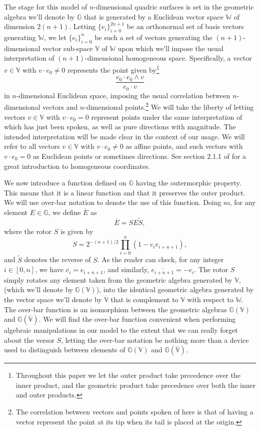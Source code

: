 \documentclass{birkjour}
\theoremstyle{definition}
\theoremstyle{remark}
\numberwithin{equation}{section}
\newcommand{\G}{\mathbb{G}}
\newcommand{\V}{\mathbb{V}}
\newcommand{\W}{\mathbb{W}}
\begin{document}
The stage for this model of $n$-dimensional quadric surfaces is set in the geometric
algebra we'll denote by $\G$ that is generated by a Euclidean vector space $\W$ of dimension
$2(n+1)$.  Letting $\{e_i\}_{i=0}^{2n+1}$ be an orthonormal set of basis vectors
generating $\W$, we let $\{e_i\}_{i=0}^n$ be such a set of vectors generating
the $(n+1)$-dimensional vector sub-space $\V$ of $\W$ upon which we'll impose the
usual interpretation of $(n+1)$-dimensional homogeneous space.  Specifically,
a vector $v\in\V$ with $v\cdot e_0\neq 0$ represents the point given by\footnote{Throughout this
paper we let the outer product take precedence over the inner product, and the geometric product
take precedence over both the inner and outer products.}
\begin{equation}
\frac{e_0\cdot e_0\wedge v}{e_0\cdot v}
\end{equation}
in $n$-dimensional Euclidean space, imposing the usual correlation between $n$-dimensional
vectors and $n$-dimensional points.\footnote{The correlation between
vectors and points spoken of here is that of having a vector represent the point
at its tip when its tail is placed at the origin.}  We will take the liberty of letting vectors $v\in\V$ with $v\cdot e_0=0$
represent points under the same interpretation of which has just been spoken, as
well as pure directions with magnitude.  The intended interpretation will be made clear
in the context of our usage.  We will refer to all vectors $v\in\V$ with $v\cdot e_0\neq 0$
as affine points, and such vectors with $v\cdot e_0=0$ as Euclidean points
or sometimes directions.  See section 2.1.1 of \cite{Birchfield98} for a great introduction to
homogeneous coordinates.

We now introduce a function defined on $\G$ having the outermorphic property.
This means that it is a linear function and that it preserves the outer product.  We will
use over-bar notation to denote the use of this function.  Doing so, for any
element $E\in\G$, we define $\overline{E}$ as
\begin{equation}
\overline{E} = SE\tilde{S},
\end{equation}
where the rotor $S$ is given by
\begin{equation}
S = 2^{-(n+1)/2}\prod_{i=0}^n\left(1-e_ie_{i+n+1}\right),
\end{equation}
and $\tilde{S}$ denotes the reverse of $S$.
As the reader can check, for any integer $i\in[0,n]$, we have $\overline{e_i}=e_{i+n+1}$,
and similarly, $\overline{e_{i+n+1}}=-e_i$.
The rotor $S$ simply rotates any element taken from the geometric algebra generated
by $\V$, (which we'll denote by $\G(\V)$), into the identical geometric
algebra generated by the vector
space we'll denote by $\overline{\V}$ that is complement to $\V$ with respect to $\W$.
The over-bar function is an isomorphism between the geometric algebras $\G(\V)$ and $\G(\overline{\V})$.
We will find the over-bar function convenient when performing algebraic manipulations in our model
to the extent that we can really forget about the versor $S$, letting the over-bar notation be nothing
more than a device used to distinguish between elements of $\G(\V)$ and $\G(\overline{\V})$.
\end{document}
